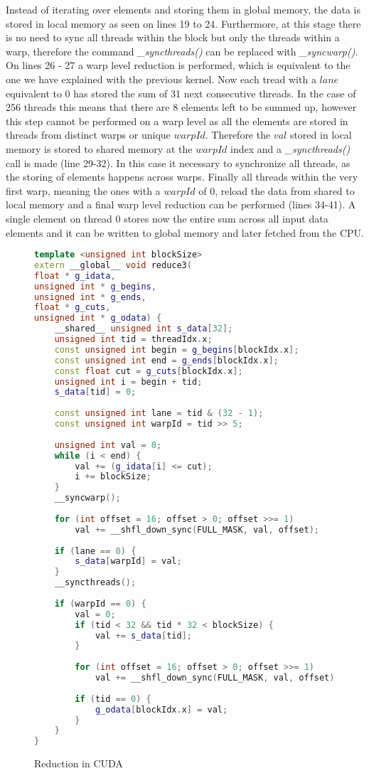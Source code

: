 \documentclass[]{article}
\begin{document}
Instead of iterating over elements and storing them in global memory, the data is stored in local memory as seen on lines 19 to 24. Furthermore, at this stage there is no need to sync all threads within the block but only the threads within a warp, therefore the command \textit{\_syncthreads()} can be replaced with \textit{\_syncwarp()}.
On lines 26 - 27 a warp level reduction is performed, which is equivalent to the one we have explained with the previous kernel. Now each tread with a $lane$ equivalent to 0 has stored the sum of 31 next consecutive threads. In the case of 256 threads this means that there are 8 elements left to be summed up, however this step cannot be performed on a warp level as all the elements are stored in threads from distinct warps or unique $warpId$. Therefore the $val$ stored in local memory is stored to shared memory at the $warpId$ index and a \textit{\_syncthreads()} call is made (line 29-32). In this case it necessary to synchronize all threads, as the storing of elements happens across warps.
Finally all threads within the very first warp, meaning the ones with a $warpId$ of 0, reload the data from shared to local memory and a final warp level reduction can be performed (lines 34-41). A single element on thread 0 stores now the entire sum across all input data elements and it can be written to global memory and later fetched from the CPU.

\begin{figure}[H]
	\begin{lstlisting}[language=c++, caption=Kernel Optimized GPU Count Left,
		label = ctlocudawrp]
template <unsigned int blockSize>
extern __global__ void reduce3(
float * g_idata,
unsigned int * g_begins,
unsigned int * g_ends,
float * g_cuts,
unsigned int * g_odata) {
	__shared__ unsigned int s_data[32];
	unsigned int tid = threadIdx.x;
	const unsigned int begin = g_begins[blockIdx.x];
	const unsigned int end = g_ends[blockIdx.x];
	const float cut = g_cuts[blockIdx.x];
	unsigned int i = begin + tid;
	s_data[tid] = 0;
	
	const unsigned int lane = tid & (32 - 1);
	const unsigned int warpId = tid >> 5;
	
	unsigned int val = 0;
	while (i < end) {
		val += (g_idata[i] <= cut);
		i += blockSize;
	}
	__syncwarp();
	
	for (int offset = 16; offset > 0; offset >>= 1)
		val += __shfl_down_sync(FULL_MASK, val, offset);
	
	if (lane == 0) {
		s_data[warpId] = val;
	}
	__syncthreads();
	
	if (warpId == 0) {
		val = 0;
		if (tid < 32 && tid * 32 < blockSize) {
			val += s_data[tid];
		}
		
		for (int offset = 16; offset > 0; offset >>= 1)
			val += __shfl_down_sync(FULL_MASK, val, offset);
		
		if (tid == 0) {
			g_odata[blockIdx.x] = val;
		}
	}
}
	\end{lstlisting}
	\caption{Reduction in CUDA}
	\label{cuda:reduction3}
\end{figure}
\end{document}
